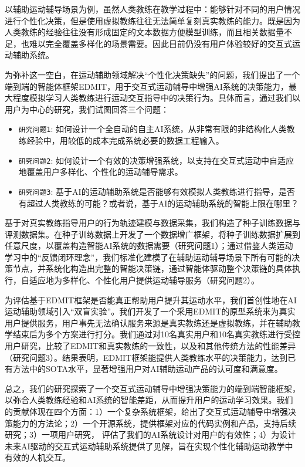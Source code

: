 \documentclass[sigconf]{acmart}
\begin{document}
以辅助运动辅导场景为例，虽然人类教练在教学过程中：能够针对不同的用户情况进行个性化决策，但是使用虚拟教练往往无法简单复刻真实教练的能力。既是因为人类教练的经验往往没有形成固定的文本数据方便模型训练，而且相关数据量不足，也难以完全覆盖多样化的场景需要。因此目前仍没有用户体验较好的交互式运动辅助系统。

为弥补这一空白，在运动辅助领域解决“个性化决策缺失”的问题，我们提出了一个端到端的智能体框架EDMIT，用于交互式运动辅导中增强AI系统的决策能力，最大程度模拟学习人类教练进行运动交互指导中的决策行为。具体而言，通过我们以用户为中心的研究，我们试图回答三个问题：

\begin{itemize}
  \item {\texttt{研究问题1}}: 如何设计一个全自动的自主AI系统，从非常有限的非结构化人类教练经验中，用较低的成本完成系统必要的数据工程输入。
  \item {\texttt{研究问题2}}: 如何设计一个有效的决策增强系统，以支持在交互式运动中自适应地覆盖用户多样化、个性化的运动辅导需求。
  \item {\texttt{研究问题3}}: 基于AI的运动辅助系统是否能够有效模拟人类教练进行指导，是否有超过人类教练的可能？或者说，基于AI的运动辅助系统的智能上限在哪里？
\end{itemize}

基于对真实教练指导用户的行为轨迹建模与数据采集，我们构造了种子训练数据与评测数据集。在种子训练数据上开发了一个数据增广框架，将种子训练数据扩展到任意尺度，以覆盖构造智能AI系统的数据需要（研究问题1）；通过借鉴人类运动学习中的“反馈闭环理念”，我们标准化建模了在辅助运动辅导场景下所有可能的决策节点，并系统化构造出完整的智能决策链，通过智能体驱动整个决策链的具体执行，自适应地为多样化、个性化用户提供运动辅导服务（研究问题2）。

为评估基于EDMIT框架是否能真正帮助用户提升其运动水平，我们首创性地在AI运动辅助领域引入“双盲实验”。我们开发了一个采用EDMIT的原型系统来为真实用户提供服务，用户事先无法确认服务来源是真实教练还是虚拟教练，并在辅助教学结束后为多个方案进行打分。我们通过对10名真实用户和10名真实教练进行受控用户研究，比较了EDMIT和真实教练的一致性，以及和其他传统方法的性能差异（研究问题3）。结果表明，EDMIT框架能提供人类教练水平的决策能力，达到已有方法中的SOTA水平，显著增强用户对AI辅助运动产品的认可度和满意度。

总之，我们的研究探索了一个交互式运动辅导中增强决策能力的端到端智能框架，以弥合人类教练经验和AI系统的智能差距，从而提升用户的运动学习效果。我们的贡献体现在四个方面：1）一个复杂系统框架，给出了交互式运动辅导中增强决策能力的方法论；2）一个开源系统，提供框架对应的代码实例和产品，支持后续研究；3）一项用户研究， 评估了我们的AI系统设计对用户的有效性；4）为设计未来AI驱动的交互式运动辅助系统提供了见解，旨在实现个性化辅助运动教学中有效的人机交互。
\end{document}
